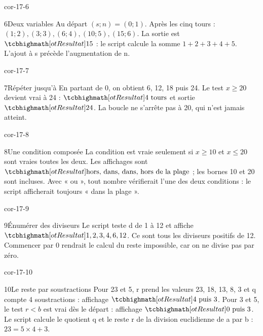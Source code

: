\begin{blocLivre}{cor-17-6}\begin{corrige}{6}{Deux variables}
Au départ $(s;n)=(0;1)$. Après les cinq tours : $(1;2),(3;3),(6;4),(10;5),(15;6)$. La sortie est $\res{15}$ : le script calcule la somme $1+2+3+4+5$. L’ajout à s précède l’augmentation de n.
\label{fig-cor-17-6}
\end{corrige}\end{blocLivre}
\begin{blocLivre}{cor-17-7}\begin{corrige}{7}{Répéter jusqu’à}
En partant de 0, on obtient 6, 12, 18 puis 24. Le test $x\ge20$ devient vrai à 24 : $\res{4\text{ tours}}$ et sortie $\res{24}$. La boucle ne s’arrête pas à 20, qui n’est jamais atteint.
\label{fig-cor-17-7}
\end{corrige}\end{blocLivre}
\begin{blocLivre}{cor-17-8}\begin{corrige}{8}{Une condition composée}
La condition est vraie seulement si $x\ge10$ et $x\le20$ sont vraies toutes les deux. Les affichages sont $\res{\text{hors, dans, dans, hors de la plage}}$ ; les bornes 10 et 20 sont incluses. Avec « ou », tout nombre vérifierait l’une des deux conditions : le script afficherait toujours « dans la plage ».
\label{fig-cor-17-8}
\end{corrige}\end{blocLivre}
\begin{blocLivre}{cor-17-9}\begin{corrige}{9}{Énumérer des diviseurs}
Le script teste d de 1 à 12 et affiche $\res{1,2,3,4,6,12}$. Ce sont tous les diviseurs positifs de 12. Commencer par 0 rendrait le calcul du reste impossible, car on ne divise pas par zéro.
\label{fig-cor-17-9}
\end{corrige}\end{blocLivre}
\begin{blocLivre}{cor-17-10}\begin{corrige}{10}{Le reste par soustractions}
Pour 23 et 5, r prend les valeurs 23, 18, 13, 8, 3 et q compte 4 soustractions : affichage $\res{4\text{ puis }3}$. Pour 3 et 5, le test $r<b$ est vrai dès le départ : affichage $\res{0\text{ puis }3}$. Le script calcule le quotient q et le reste r de la division euclidienne de a par b : $23=5\times4+3$.
\label{fig-cor-17-10}
\end{corrige}\end{blocLivre}
